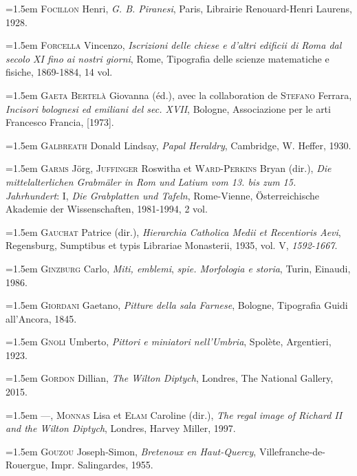 \documentclass[12pt,twoside,openany]{book}
\newenvironment{PurhBibliography}
  {%
    \par
    \setlength{\parindent}{0pt}%
    \setlength{\leftskip}{0pt}%
  }
  {%
    \par
  }
\begin{document}
\begin{PurhBibliography}
\noindent\hangindent=1.5em \textsc{Focillon} Henri, \textit{G. B. Piranesi}, Paris, Librairie Renouard-Henri Laurens, 1928.\par
\noindent\hangindent=1.5em \textsc{Forcella} Vincenzo, \textit{Iscrizioni delle chiese e d’altri edificii di Roma dal secolo XI fino ai nostri giorni}, Rome, Tipografia delle scienze matematiche e fisiche, 1869-1884, 14 vol.\par
\noindent\hangindent=1.5em \textsc{Gaeta Bertelà} Giovanna (éd.), avec la collaboration de \textsc{Stefano} Ferrara, \textit{Incisori bolognesi ed emiliani del sec. XVII}, Bologne, Associazione per le arti Francesco Francia, [1973].\par
\noindent\hangindent=1.5em \textsc{Galbreath }Donald Lindsay, \textit{Papal Heraldry}, Cambridge, W. Heffer, 1930.\par
\noindent\hangindent=1.5em \textsc{Garms} Jörg, \textsc{Juffinger} Roswitha et \textsc{Ward}-\textsc{Perkins} Bryan (dir.),\textit{ Die mittelalterlichen Grabmäler in Rom und Latium vom 13. bis zum 15. Jahrhundert}: I, \textit{Die Grabplatten und Tafeln}, Rome-Vienne, Österreichische Akademie der Wissenschaften, 1981-1994, 2 vol.\par
\noindent\hangindent=1.5em \textsc{Gauchat }Patrice (dir.), \textit{Hierarchia Catholica Medii et Recentioris Aevi}, Regensburg, Sumptibus et typis Librariae Monasterii, 1935, vol. V, \textit{1592-1667}.\par
\noindent\hangindent=1.5em \textsc{Ginzburg }Carlo, \textit{Miti, emblemi}, \textit{spie. Morfologia e storia}, Turin, Einaudi, 1986.\par
\noindent\hangindent=1.5em \textsc{Giordani} Gaetano, \textit{Pitture della sala Farnese}, Bologne, Tipografia Guidi all’Ancora, 1845.\par
\noindent\hangindent=1.5em \textsc{Gnoli} Umberto, \textit{Pittori e miniatori nell’Umbria}, Spolète, Argentieri, 1923.\par
\noindent\hangindent=1.5em \textsc{Gordon} Dillian, \textit{The Wilton Diptych}, Londres, The National Gallery, 2015.\par
\noindent\hangindent=1.5em —, \textsc{Monnas} Lisa et \textsc{Elam} Caroline (dir.), \textit{The regal image of Richard II and the Wilton Diptych}, Londres, Harvey Miller, 1997.\par
\noindent\hangindent=1.5em \textsc{Gouzou} Joseph-Simon, \textit{Bretenoux en Haut-Quercy}, Villefranche-de-Rouergue, Impr. Salingardes, 1955.\par

\end{PurhBibliography}
\end{document}

